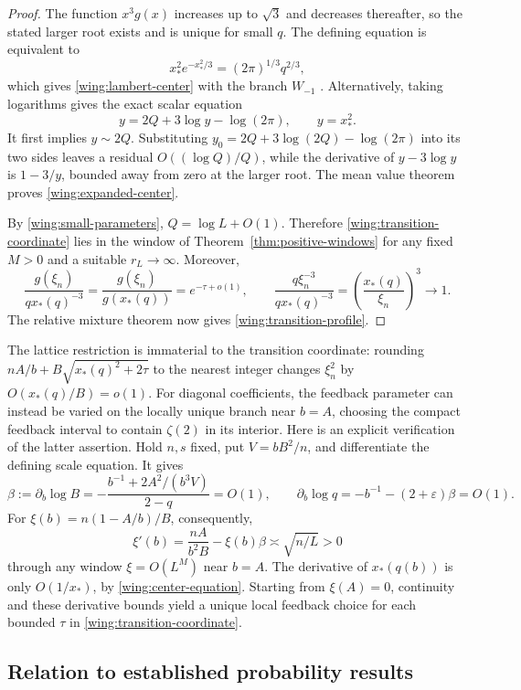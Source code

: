 \begin{proof}
The function $x^3g(x)$ increases up to $\sqrt3$ and decreases
thereafter, so the stated larger root exists and is unique for
small $q$.  The defining equation is equivalent to
\[
 x_*^2e^{-x_*^2/3}=(2\pi)^{1/3}q^{2/3},
\]
which gives \eqref{wing:lambert-center} with the branch $W_{-1}$ \cite{dlmf-lambert}.
Alternatively, taking logarithms gives the exact scalar equation
\begin{equation}\label{wing:center-equation}
 y=2Q+3\log y-\log(2\pi),\qquad y=x_*^2.
\end{equation}
It first implies $y\sim2Q$.  Substituting
$y_0=2Q+3\log(2Q)-\log(2\pi)$ into its two sides leaves a
residual $O((\log Q)/Q)$, while the derivative of
$y-3\log y$ is $1-3/y$, bounded away from zero at the larger
root.  The mean value theorem proves
\eqref{wing:expanded-center}.

By \eqref{wing:small-parameters}, $Q=\log L+O(1)$.
Therefore \eqref{wing:transition-coordinate} lies in the
window of Theorem~\ref{thm:positive-windows} for any fixed $M>0$
and a suitable $r_L\to\infty$.  Moreover,
\[
 \frac{g(\xi_n)}{qx_*(q)^{-3}}
 =\frac{g(\xi_n)}{g(x_*(q))}
 =e^{-\tau+o(1)},\qquad
 \frac{q\xi_n^{-3}}{qx_*(q)^{-3}}
 =\left(\frac{x_*(q)}{\xi_n}\right)^3\longrightarrow1.
\]
The relative mixture theorem now gives
\eqref{wing:transition-profile}.
\end{proof}

The lattice restriction is immaterial to the transition coordinate:
rounding $nA/b+B\sqrt{x_*(q)^2+2\tau}$ to the nearest
integer changes $\xi_n^2$ by $O(x_*(q)/B)=o(1)$.
For diagonal coefficients, the feedback parameter can instead be
varied on the locally unique branch near $b=A$, choosing the compact
feedback interval to contain $\zeta(2)$ in its interior.  Here is an explicit
verification of the latter assertion.  Hold $n,s$ fixed, put
$V=bB^2/n$, and differentiate the defining scale equation.  It gives
\[
 \beta:=\partial_b\log B
 =-\frac{b^{-1}+2A^2/(b^3V)}{2-q}=O(1),\qquad
 \partial_b\log q=-b^{-1}-(2+\varepsilon)\beta=O(1).
\]
For $\xi(b)=n(1-A/b)/B$, consequently,
\[
 \xi'(b)=\frac{nA}{b^2B}-\xi(b)\beta
                  \asymp\sqrt{n/L}>0
\]
through any window $\xi=O(L^M)$ near $b=A$.  The derivative of
$x_*(q(b))$ is only $O(1/x_*)$, by
\eqref{wing:center-equation}.  Starting from $\xi(A)=0$,
continuity and these derivative bounds yield a unique local
feedback choice for each bounded $\tau$ in
\eqref{wing:transition-coordinate}.

\subsection{Relation to established probability results}

